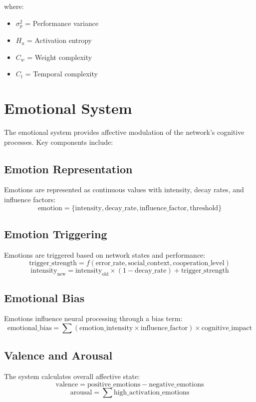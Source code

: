 \documentclass{article}
\begin{document}
where:
\begin{itemize}
\item $\sigma_p^2$ = Performance variance
\item $H_a$ = Activation entropy
\item $C_w$ = Weight complexity
\item $C_t$ = Temporal complexity
\end{itemize}

\section{Emotional System}
The emotional system provides affective modulation of the network's cognitive processes. Key components include:

\subsection{Emotion Representation}
Emotions are represented as continuous values with intensity, decay rates, and influence factors:
\[
\text{emotion} = \{\text{intensity}, \text{decay\_rate}, \text{influence\_factor}, \text{threshold}\}
\]

\subsection{Emotion Triggering}
Emotions are triggered based on network states and performance:
\[
\text{trigger\_strength} = f(\text{error\_rate}, \text{social\_context}, \text{cooperation\_level})
\]
\[
\text{intensity}_{\text{new}} = \text{intensity}_{\text{old}} \times (1 - \text{decay\_rate}) + \text{trigger\_strength}
\]

\subsection{Emotional Bias}
Emotions influence neural processing through a bias term:
\[
\text{emotional\_bias} = \sum (\text{emotion\_intensity} \times \text{influence\_factor}) \times \text{cognitive\_impact}
\]

\subsection{Valence and Arousal}
The system calculates overall affective state:
\[
\text{valence} = \text{positive\_emotions} - \text{negative\_emotions}
\]
\[
\text{arousal} = \sum \text{high\_activation\_emotions}
\]
\end{document}
